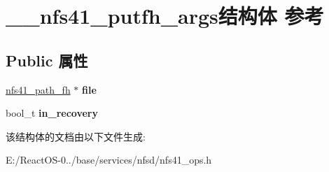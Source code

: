 \hypertarget{struct____nfs41__putfh__args}{}\section{\+\_\+\+\_\+nfs41\+\_\+putfh\+\_\+args结构体 参考}
\label{struct____nfs41__putfh__args}
\subsection*{Public 属性}
\begin{DoxyCompactItemize}
\item 
\mbox{\label{struct____nfs41__putfh__args_a4a7517116320770fa0fe69af0aa73ef1}} 
\hyperlink{struct____nfs41__path__fh}{nfs41\+\_\+path\+\_\+fh} $\ast$ {\bfseries file}
\item 
\mbox{\label{struct____nfs41__putfh__args_ae61c19af419e16252ad66bceda3d9d90}} 
bool\+\_\+t {\bfseries in\+\_\+recovery}
\end{DoxyCompactItemize}


该结构体的文档由以下文件生成\+:\begin{DoxyCompactItemize}
\item 
E\+:/\+React\+O\+S-\/0../base/services/nfsd/nfs41\+\_\+ops.\+h\end{DoxyCompactItemize}
